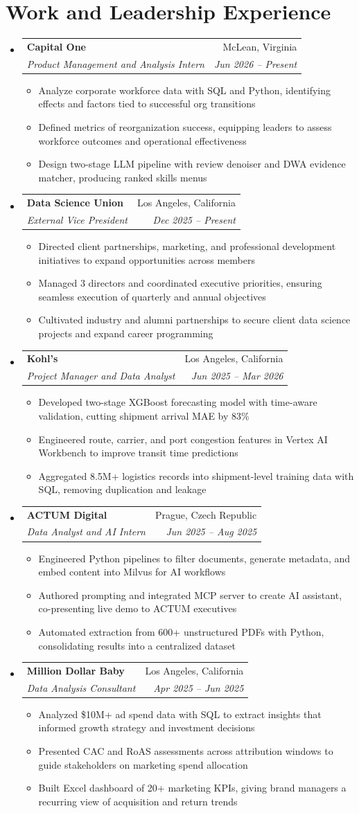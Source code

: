 \documentclass[letterpaper,11pt]{article}
\makeatletter
\newcommand{\resumeItem}[1]{
  \item\small{#1}
}
\newcommand{\resumeSubheading}[4]{
  \vspace{-2pt}\item
    \begin{tabular*}{\textwidth}[t]{l@{\extracolsep{\fill}}r}
      \textbf{#1} & #2 \\
      \textit{\small#3} & \textit{\small #4} \\
    \end{tabular*}\vspace{-7pt}
}
\newcommand{\resumeSubHeadingListStart}{\begin{itemize}[leftmargin=0in, label={}]}
\newcommand{\resumeSubHeadingListEnd}{\end{itemize}}
\newcommand{\resumeItemListStart}{\begin{itemize}[itemsep= 1.5pt, parsep=0pt]}
\newcommand{\resumeItemListEnd}{\end{itemize}\vspace{-5pt}}
\makeatother
\begin{document}
\section{Work and Leadership Experience}
  \resumeSubHeadingListStart
    \resumeSubheading
      {Capital One}{McLean, Virginia}
      {Product Management and Analysis Intern}{Jun 2026 -- Present}
      \resumeItemListStart
        \resumeItem{Analyze corporate workforce data with SQL and Python, identifying effects and factors tied to successful org transitions}
        \resumeItem{Defined metrics of reorganization success, equipping leaders to assess workforce outcomes and operational effectiveness}
        \resumeItem{Design two-stage LLM pipeline with review denoiser and DWA evidence matcher, producing ranked skills menus}
      \resumeItemListEnd
    \resumeSubheading
      {Data Science Union}{Los Angeles, California}
      {External Vice President}{Dec 2025 -- Present}
      \resumeItemListStart
        \resumeItem{Directed client partnerships, marketing, and professional development initiatives to expand opportunities across members}
        \resumeItem{Managed 3 directors and coordinated executive priorities, ensuring seamless execution of quarterly and annual objectives}
        \resumeItem{Cultivated industry and alumni partnerships to secure client data science projects and expand career programming}
      \resumeItemListEnd
    \resumeSubheading
      {Kohl's}{Los Angeles, California}
      {Project Manager and Data Analyst}{Jun 2025 -- Mar 2026}
      \resumeItemListStart
        \resumeItem{Developed two-stage XGBoost forecasting model with time-aware validation, cutting shipment arrival MAE by 83\%}
        \resumeItem{Engineered route, carrier, and port congestion features in Vertex AI Workbench to improve transit time predictions}
        \resumeItem{Aggregated 8.5M+ logistics records into shipment-level training data with SQL, removing duplication and leakage}
      \resumeItemListEnd
    \resumeSubheading
      {ACTUM Digital}{Prague, Czech Republic}
      {Data Analyst and AI Intern}{Jun 2025 -- Aug 2025}
      \resumeItemListStart
        \resumeItem{Engineered Python pipelines to filter documents, generate metadata, and embed content into Milvus for AI workflows}
        \resumeItem{Authored prompting and integrated MCP server to create AI assistant, co-presenting live demo to ACTUM executives}
        \resumeItem{Automated extraction from 600+ unstructured PDFs with Python, consolidating results into a centralized dataset}
      \resumeItemListEnd
    \resumeSubheading
      {Million Dollar Baby}{Los Angeles, California}
      {Data Analysis Consultant}{Apr 2025 -- Jun 2025}
      \resumeItemListStart
        \resumeItem{Analyzed \$10M+ ad spend data with SQL to extract insights that informed growth strategy and investment decisions}
        \resumeItem{Presented CAC and RoAS assessments across attribution windows to guide stakeholders on marketing spend allocation}
        \resumeItem{Built Excel dashboard of 20+ marketing KPIs, giving brand managers a recurring view of acquisition and return trends}
      \resumeItemListEnd
  \resumeSubHeadingListEnd
\end{document}
